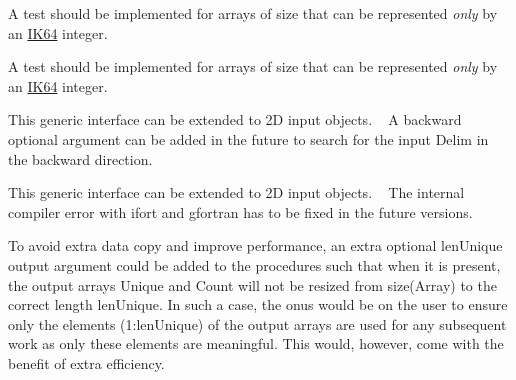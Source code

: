 \begin{DoxyRefList}
\item[Type \mbox{\hyperlink{interfaceArraySort__mod_1_1sort}{Array\+Sort\+\_\+mod\+::sort}} ]\label{todo__todo000020}%
%
 A test should be implemented for arrays of size that can be represented {\itshape only} by an \mbox{\hyperlink{namespaceConstants__mod_ad6aaf2f477491dc84e7ebbab3b64694e}{IK64}} integer. 
\item[Type \mbox{\hyperlink{interfaceArraySort__mod_1_1sortIndex}{Array\+Sort\+\_\+mod\+::sort\+Index}} ]\label{todo__todo000021}%
%
 A test should be implemented for arrays of size that can be represented {\itshape only} by an \mbox{\hyperlink{namespaceConstants__mod_ad6aaf2f477491dc84e7ebbab3b64694e}{IK64}} integer. 
\item[Type \mbox{\hyperlink{interfaceArraySplit__mod_1_1split}{Array\+Split\+\_\+mod\+::split}} ]\label{todo__todo000022}%
%
 This generic interface can be extended to 2D input objects. ~\newline
 A {\ttfamily backward} optional argument can be added in the future to search for the input {\ttfamily Delim} in the backward direction. ~\newline
 
\item[Type \mbox{\hyperlink{interfaceArrayUnique__mod_1_1genUnique}{Array\+Unique\+\_\+mod\+::gen\+Unique}} ]\label{todo__todo000023}%
%
 This generic interface can be extended to 2D input objects. ~\newline
 The internal compiler error with {\ttfamily ifort} and {\ttfamily gfortran} has to be fixed in the future versions. ~\newline
 
\item[Type \mbox{\hyperlink{interfaceArrayUnique__mod_1_1getUnique}{Array\+Unique\+\_\+mod\+::get\+Unique}} ]\label{todo__todo000025}%
%
 To avoid extra data copy and improve performance, an extra optional {\ttfamily len\+Unique} output argument could be added to the procedures such that when it is present, the output arrays {\ttfamily Unique} and {\ttfamily Count} will not be resized from {\ttfamily size(\+Array)} to the correct length {\ttfamily len\+Unique}. In such a case, the onus would be on the user to ensure only the elements {\ttfamily (1\+:len\+Unique)} of the output arrays are used for any subsequent work as only these elements are meaningful. This would, however, come with the benefit of extra efficiency.


\end{DoxyRefList}
